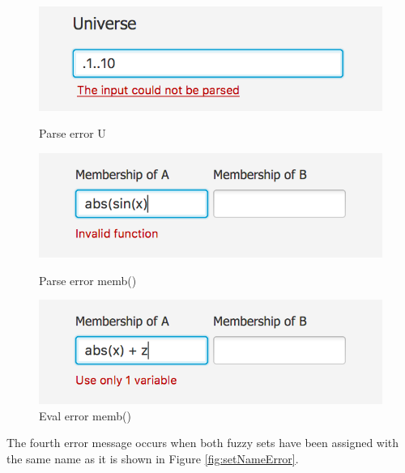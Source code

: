 \documentclass[12pt,a4paper,titlepage,final]{article}
\begin{document}
\begin{figure}[!htb]
  \includegraphics[width=\linewidth]{img/universe-definition-error}
  \caption{Parse error U}\label{fig:universeDefinitionError}
\endminipage\hfill
{}
  \includegraphics[width=\linewidth]{img/membership-parse-error}
  \caption{Parse error memb()}\label{fig:membershipParseError}
\endminipage\hfill
{}
  \includegraphics[width=\linewidth]{img/membership-evaluation-error}
  \caption{Eval error memb()}\label{fig:membershipEvalError}
\endminipage
\end{figure}

The fourth error message occurs when both fuzzy sets have been assigned with the same name as it is shown in Figure \ref{fig:setNameError}.
\end{document}
